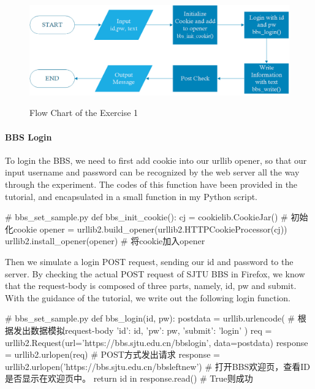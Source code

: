 \documentclass{article}
\begin{document}
\begin{figure}[htbp]
\centering
\includegraphics[width=13.5cm]{img/flowchart.png}
\label{fig:flowchart}
\caption{Flow Chart of the Exercise 1}
\end{figure}

\paragraph{BBS Login} To login the BBS, we need to first add cookie into our urllib opener, so that our input username and password can be recognized by the web server all the way through the experiment. The codes of this function have been provided in the tutorial, and encapsulated in a small function in my Python script.
\begin{python}
# bbs_set_sample.py
def bbs_init_cookie():
    cj = cookielib.CookieJar()      # 初始化cookie
    opener = urllib2.build_opener(urllib2.HTTPCookieProcessor(cj))
    urllib2.install_opener(opener)  # 将cookie加入opener
\end{python} 

Then we simulate a login POST request, sending our id and password to the server. By checking the actual POST request of SJTU BBS in Firefox, we know that the request-body is composed of three parts, namely, id, pw and submit. With the guidance of the tutorial, we write out the following login function.

\begin{python}
# bbs_set_sample.py
def bbs_login(id, pw):
    postdata = urllib.urlencode({    # 根据发出数据模拟request-body
        'id': id,
        'pw': pw,
        'submit': 'login'
    })
    req = urllib2.Request(url='https://bbs.sjtu.edu.cn/bbslogin', data=postdata)
    response = urllib2.urlopen(req)  # POST方式发出请求
    response = urllib2.urlopen('https://bbs.sjtu.edu.cn/bbsleftnew')  
                                  # 打开BBS欢迎页，查看ID是否显示在欢迎页中。
    return id in response.read()     # True则成功
\end{python}
\end{document}

